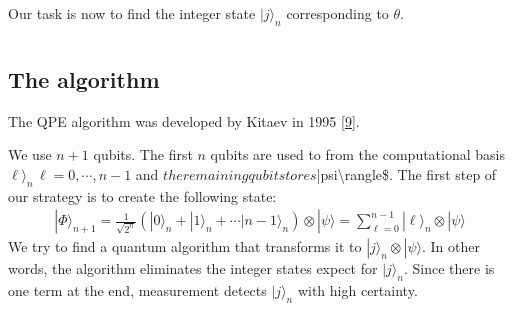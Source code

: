 \documentclass[letterpaper,10pt,english]{jupyterBook}
\begin{document}
\sphinxAtStartPar
Our task is now to find the integer state \(|j\rangle_n\) corresponding to \(\theta\).


\section{}
\label{\detokenize{algorithms/qpe:id1}}

\subsection{The algorithm}
\label{\detokenize{algorithms/qpe:the-algorithm}}
\sphinxAtStartPar
The QPE algorithm was developed by Kitaev in 1995 {[}\hyperlink{cite.references:id18}{9}{]}.

\sphinxAtStartPar
We use \(n+1\) qubits.  The first \(n\) qubits are used to from  the computational basis \(\ell\rangle_n\, \ell=0,\cdots, n-1\) and \(the remaining qubit stores \)|psi\textbackslash{}rangle\$.
The first step of our strategy is to create the following state:
\begin{equation}\label{equation:algorithms/qpe:qpe-step1}
\begin{split}
|\Phi\rangle_{n+1} = \frac{1}{\sqrt{2^n}} \left (|0\rangle_n  + |1\rangle_n + \cdots |n-1\rangle_n \right) \otimes |\psi\rangle = \sum_{\ell=0}^{n-1} |\ell\rangle_n \otimes |\psi\rangle
\end{split}
\end{equation}
\sphinxAtStartPar
We try to find a quantum algorithm that transforms it to \(|j\rangle_n \otimes |\psi\rangle\).  In other words, the algorithm eliminates the integer states expect for \(|j\rangle_n\).  Since there is one term at the end, measurement detects \(|j\rangle_n\) with high certainty.
\end{document}
